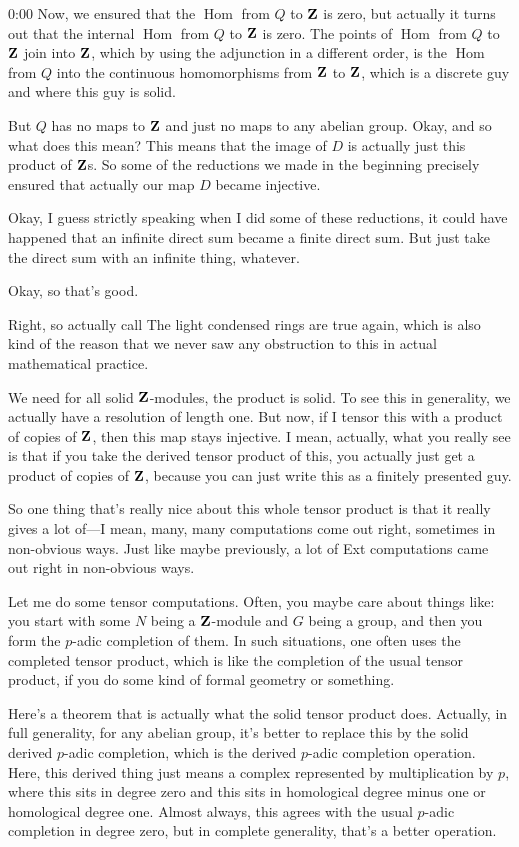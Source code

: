 \begin{unfinished}{0:00}
Now, we ensured that the $\operatorname{Hom}$ from $Q$ to $\mathbf Z$ is zero, but actually it turns out that the internal $\operatorname{Hom}$ from $Q$ to $\mathbf Z$ is zero. The points of $\operatorname{Hom}$ from $Q$ to $\mathbf Z$ join into $\mathbf Z$, which by using the adjunction in a different order, is the $\operatorname{Hom}$ from $Q$ into the continuous homomorphisms from $\mathbf Z$ to $\mathbf Z$, which is a discrete guy and where this guy is solid. 

But $Q$ has no maps to $\mathbf Z$ and just no maps to any abelian group. Okay, and so what does this mean? This means that the image of $D$ is actually just this product of $\mathbf Z$s. So some of the reductions we made in the beginning precisely ensured that actually our map $D$ became injective.

Okay, I guess strictly speaking when I did some of these reductions, it could have happened that an infinite direct sum became a finite direct sum. But just take the direct sum with an infinite thing, whatever.

Okay, so that's good.

Right, so actually call
The light condensed rings are true again, which is also kind of the reason that we never saw any obstruction to this in actual mathematical practice.

We need for all solid $\mathbf Z$-modules, the product is solid. To see this in generality, we actually have a resolution of length one. But now, if I tensor this with a product of copies of $\mathbf Z$, then this map stays injective. I mean, actually, what you really see is that if you take the derived tensor product of this, you actually just get a product of copies of $\mathbf Z$, because you can just write this as a finitely presented guy.

So one thing that's really nice about this whole tensor product is that it really gives a lot of---I mean, many, many computations come out right, sometimes in non-obvious ways. Just like maybe previously, a lot of Ext computations came out right in non-obvious ways.

Let me do some tensor computations. Often, you maybe care about things like: you start with some $N$ being a $\mathbf Z$-module and $G$ being a group, and then you form the $p$-adic completion of them. In such situations, one often uses the completed tensor product, which is like the completion of the usual tensor product, if you do some kind of formal geometry or something.

Here's a theorem that is actually what the solid tensor product does. Actually, in full generality, for any abelian group, it's better to replace this by the solid derived $p$-adic completion, which is the derived $p$-adic completion operation. Here, this derived thing just means a complex represented by multiplication by $p$, where this sits in degree zero and this sits in homological degree minus one or homological degree one. Almost always, this agrees with the usual $p$-adic completion in degree zero, but in complete generality, that's a better operation.


\end{unfinished}
